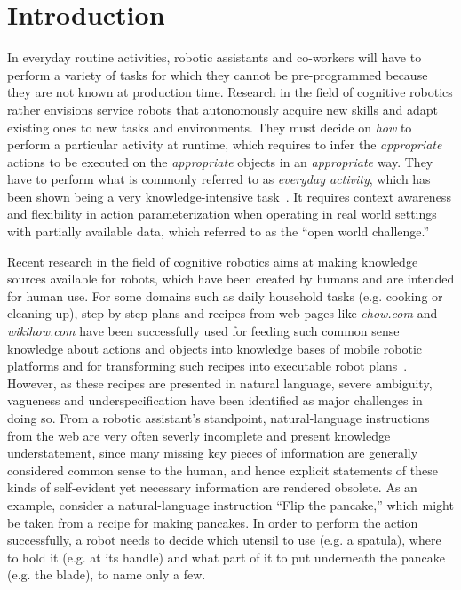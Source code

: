 \documentclass[oribibl]{llncs}
\begin{document}
\section{Introduction} 

In everyday routine activities, robotic assistants and co-workers 
will have to perform a variety of tasks for which they cannot be 
pre-programmed because they are not known at production time. 
Research in the field of cognitive robotics rather envisions service 
robots that autonomously acquire new skills and adapt existing ones 
to new tasks and environments. They must decide on \textit{how} to 
perform a particular activity at runtime, which requires to infer 
the \textit{appropriate} actions to be executed on the \textit 
{appropriate} objects in an \textit{appropriate} way. They have to 
perform what is commonly referred to as \textit{everyday activity}, 
which has been shown being a very knowledge-intensive task~\cite 
{anderson95phd, nyga12actioncore}. It requires context awareness and 
flexibility in action parameterization when operating in real world 
settings with partially available data, which referred to as the ``open 
world challenge.'' 

Recent research in the field of cognitive robotics aims at making 
knowledge sources available for robots, which have been created by 
humans and are intended for human use. For some domains such as 
daily household tasks (e.g. cooking or cleaning up), step-by-step 
plans and recipes from web pages like \textit {ehow.com} and \textit 
{wikihow.com} have been successfully used for feeding such common 
sense knowledge about actions and objects into knowledge bases of 
mobile robotic platforms and for transforming such recipes into 
executable robot plans~\cite{tenorth10webinstructions}. However, as 
these recipes are presented in natural language, severe ambiguity, 
vagueness and underspecification have been identified as major 
challenges in doing so. From a robotic assistant's standpoint, 
natural-language instructions from the web are very often severly 
incomplete and present knowledge understatement, since many missing 
key pieces of information are generally considered common sense to 
the human, and hence explicit statements of these kinds of 
self-evident yet necessary information are rendered obsolete. As an 
example, consider a natural-language instruction ``Flip the 
pancake,'' which might be taken from a recipe for making pancakes. 
In order to perform the action successfully, a robot needs to decide 
which utensil to use (e.g. a spatula), where to hold it (e.g. at its 
handle) and what part of it to put underneath the pancake (e.g. the 
blade), to name only a few.
\end{document}
